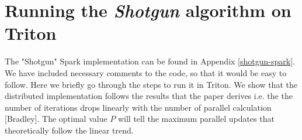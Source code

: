 \documentclass[a4paper,11pt]{article}
\begin{document}
\section{Running the \textit{Shotgun} algorithm on Triton}
The "Shotgun" Spark implementation can be found in Appendix \ref{shotgun-spark}. We have included necessary comments to the code, so that it would be easy to follow. Here we briefly go through the steps to run it in Triton. We show that the distributed implementation follows the results that the paper derives i.e. the the number of iterations drops linearly with the number of parallel calculation [Bradley]. The optimal value $P$ will tell the maximum parallel updates that theoretically follow the linear trend.
\end{document}
